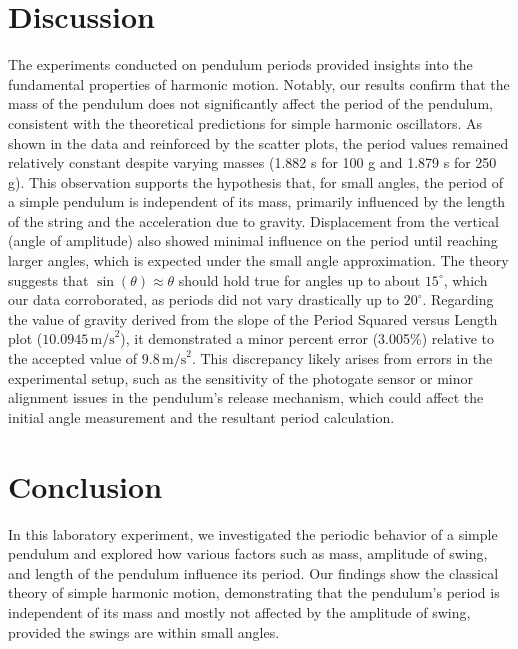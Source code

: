 \documentclass{report}
\begin{document}
    \bigbreak \noindent 
    \section{Discussion}
    \bigbreak \noindent 
    \bigbreak \noindent
    The experiments conducted on pendulum periods provided insights into the fundamental properties of harmonic motion. Notably, our results confirm that the mass of the pendulum does not significantly affect the period of the pendulum, consistent with the theoretical predictions for simple harmonic oscillators. As shown in the data and reinforced by the scatter plots, the period values remained relatively constant despite varying masses (1.882 s for 100 g and 1.879 s for 250 g). This observation supports the hypothesis that, for small angles, the period of a simple pendulum is independent of its mass, primarily influenced by the length of the string and the acceleration due to gravity.
    \bigbreak \noindent
    Displacement from the vertical (angle of amplitude) also showed minimal influence on the period until reaching larger angles, which is expected under the small angle approximation. The theory suggests that $\sin(\theta) \approx \theta$ should hold true for angles up to about $15^\circ$, which our data corroborated, as periods did not vary drastically up to $20^\circ$. Regarding the value of gravity derived from the slope of the Period Squared versus Length plot ($10.0945 \, \text{m/s}^2$), it demonstrated a minor percent error (3.005\%) relative to the accepted value of $9.8 \, \text{m/s}^2$. This discrepancy likely arises from errors in the experimental setup, such as the sensitivity of the photogate sensor or minor alignment issues in the pendulum's release mechanism, which could affect the initial angle measurement and the resultant period calculation.
    \bigbreak \noindent

    \bigbreak \noindent 
    \section{Conclusion}
    \bigbreak \noindent 
    In this laboratory experiment, we investigated the periodic behavior of a simple pendulum and explored how various factors such as mass, amplitude of swing, and length of the pendulum influence its period. Our findings show the classical theory of simple harmonic motion, demonstrating that the pendulum's period is independent of its mass and mostly not affected by the amplitude of swing, provided the swings are within small angles. 










    
\end{document}
